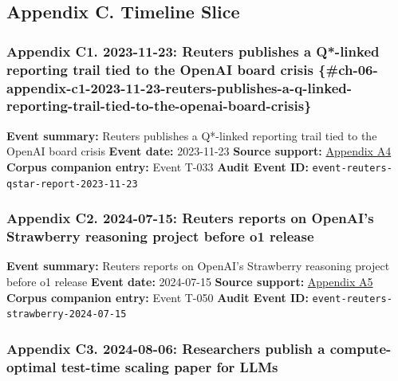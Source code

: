 \documentclass[
  american,
  11pt,
  letterpaper,
]{article}
\begin{document}
\subsection{Appendix C. Timeline
Slice}\label{appendix-c.-timeline-slice-6}

\subsubsection{Appendix C1. 2023-11-23: Reuters publishes a Q*-linked
reporting trail tied to the OpenAI board crisis
\{\#ch-06-appendix-c1-2023-11-23-reuters-publishes-a-q-linked-reporting-trail-tied-to-the-openai-board-crisis\}}\label{appendix-c1.-2023-11-23-reuters-publishes-a-q-linked-reporting-trail-tied-to-the-openai-board-crisis-ch-06-appendix-c1-2023-11-23-reuters-publishes-a-q-linked-reporting-trail-tied-to-the-openai-board-crisis}

\textbf{Event summary:} Reuters publishes a Q*-linked reporting trail
tied to the OpenAI board crisis \textbf{Event date:} 2023-11-23
\textbf{Source support:}
\hyperref[ch-06-appendix-a4-openai-researchers-warned-board-of-ai-breakthrough-ahead-of-ceo-ouster-sources-say]{Appendix
A4} \textbf{Corpus companion entry:} Event T-033 \textbf{Audit Event
ID:} \texttt{event-reuters-qstar-report-2023-11-23}

\subsubsection{Appendix C2. 2024-07-15: Reuters reports on OpenAI's
Strawberry reasoning project before o1
release}\label{ch-06-appendix-c2-2024-07-15-reuters-reports-on-openai-s-strawberry-reasoning-project-before-o1-release}

\textbf{Event summary:} Reuters reports on OpenAI's Strawberry reasoning
project before o1 release \textbf{Event date:} 2024-07-15 \textbf{Source
support:}
\hyperref[ch-06-appendix-a5-exclusive-openai-working-on-new-reasoning-technology-under-code-name-strawberry]{Appendix
A5} \textbf{Corpus companion entry:} Event T-050 \textbf{Audit Event
ID:} \texttt{event-reuters-strawberry-2024-07-15}

\subsubsection{Appendix C3. 2024-08-06: Researchers publish a
compute-optimal test-time scaling paper for
LLMs}\label{ch-06-appendix-c3-2024-08-06-researchers-publish-a-compute-optimal-test-time-scaling-paper-for-llms}
\end{document}
